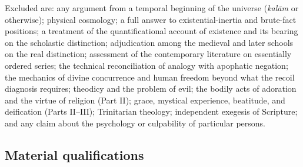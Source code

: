 Excluded are: any argument from a temporal beginning of the universe (\emph{kal\=am} or otherwise); physical cosmology; a full answer to existential-inertia and brute-fact positions; a treatment of the quantificational account of existence and its bearing on the scholastic distinction; adjudication among the medieval and later schools on the real distinction; assessment of the contemporary literature on essentially ordered series; the technical reconciliation of analogy with apophatic negation; the mechanics of divine concurrence and human freedom beyond what the recoil diagnosis requires; theodicy and the problem of evil; the bodily acts of adoration and the virtue of religion (Part II); grace, mystical experience, beatitude, and deification (Parts II--III); Trinitarian theology; independent exegesis of Scripture; and any claim about the psychology or culpability of particular persons.

\subsection{Material qualifications}

